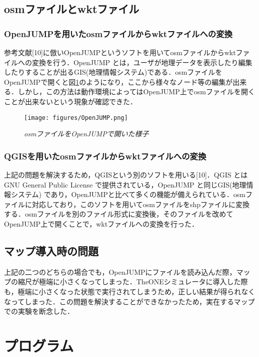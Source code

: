 \documentclass[11pt]{icsthesis}
\begin{document}
\section{osmファイルとwktファイル}

\subsection{OpenJUMPを用いたosmファイルからwktファイルへの変換}
参考文献[10]に倣いOpenJUMPというソフトを用いてosmファイルからwktファイルへの変換を行う．OpenJUMP とは，ユーザが地理データを表示したり編集したりすることが出るGIS(地理情報システム)である．osmファイルをOpenJUMPで開くと図\ref{OpenJUMP}のようになり，ここから様々なノード等の編集が出来る．しかし，この方法は動作環境によってはOpenJUMP上でosmファイルを開くことが出来ないという現象が確認できた．
\begin{figure}[H]
	\centering
	\texttt{[image: figures/OpenJUMP.png]}
\caption[]{\it{osmファイルをOpenJUMPで開いた様子}}
\label{OpenJUMP}
\end{figure}
\subsection{QGISを用いたosmファイルからwktファイルへの変換}
上記の問題を解決するため，QGISという別のソフトを用いる[10]．QGIS とはGNU General Public License で提供されている，OpenJUMP と同じGIS(地理情報システム) であり，OpenJUMPと比べて多くの機能が備えられている．osmファイルに対応しており，このソフトを用いてosmファイルをshpファイルに変換する．osmファイルを別のファイル形式に変換後，そのファイルを改めてOpenJUMP上で開くことで，wktファイルへの変換を行った．
\section{マップ導入時の問題}
上記の二つのどちらの場合でも，OpenJUMPにファイルを読み込んだ際，マップの縮尺が極端に小さくなってしまった．TheONEシミュレータに導入した際も，極端に小さくなった状態で実行されてしまうため，正しい結果が得られなくなってしまった．この問題を解決することができなかったため，実在するマップでの実験を断念した．

\newpage

\chapter{プログラム}
\lstset{
    frame=single,
    numbers=left,
    tabsize=2
}
\end{document}
